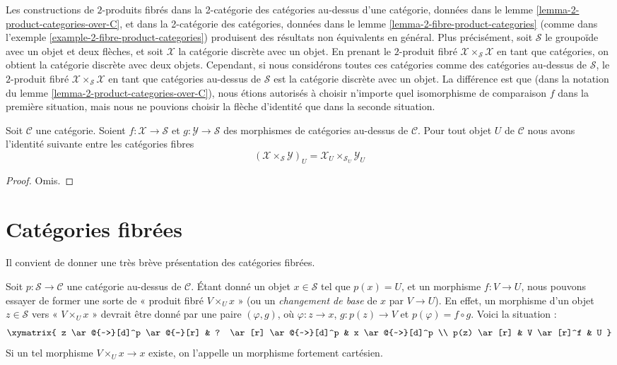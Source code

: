 \begin{example}
\label{example-different-2-fibre-products}
Les constructions de $2$-produits fibrés dans la 2-catégorie des catégories
au-dessus d'une catégorie, données dans le lemme \ref{lemma-2-product-categories-over-C},
et dans la 2-catégorie des catégories, données dans le lemme
\ref{lemma-2-fibre-product-categories} (comme dans l'exemple
\ref{example-2-fibre-product-categories}) produisent des résultats non
équivalents en général. Plus précisément, soit $\mathcal{S}$ le groupoïde
avec un objet et deux flèches, et soit $\mathcal{X}$ la catégorie discrète
avec un objet. En prenant le $2$-produit fibré $\mathcal{X} \times_\mathcal{S} \mathcal{X}$ en tant que catégories, on obtient la catégorie
discrète avec deux objets. Cependant, si nous considérons toutes ces catégories
comme des catégories au-dessus de $\mathcal{S}$, le $2$-produit fibré $\mathcal{X} \times_\mathcal{S} \mathcal{X}$ en tant que catégories au-dessus de $\mathcal{S}$ est
la catégorie discrète avec un objet. La différence est que (dans la notation
du lemme \ref{lemma-2-product-categories-over-C}), nous étions autorisés à
choisir n'importe quel isomorphisme de comparaison $f$ dans la première
situation, mais nous ne pouvions choisir la flèche d'identité que dans la
seconde situation.
\end{example}

\begin{lemma}
\label{lemma-fibre-2-fibre-product-categories-over-C}
Soit $\mathcal{C}$ une catégorie. Soient $f : \mathcal{X} \to \mathcal{S}$ et $g : \mathcal{Y} \to \mathcal{S}$ des morphismes de catégories au-dessus de $\mathcal{C}$.
Pour tout objet $U$ de $\mathcal{C}$ nous avons l'identité suivante entre les
catégories fibres
$$
\left(\mathcal{X} \times_\mathcal{S}\mathcal{Y}\right)_U
=
\mathcal{X}_U \times_{\mathcal{S}_U} \mathcal{Y}_U
$$
\end{lemma}

\begin{proof}
Omis.
\end{proof}

\section{Catégories fibrées}
\label{section-fibred-categories}

\noindent
Il convient de donner une très brève présentation des catégories fibrées.

\medskip\noindent
Soit $p : \mathcal{S} \to \mathcal{C}$ une catégorie au-dessus de
$\mathcal{C}$. Étant donné un objet $x \in \mathcal{S}$ tel que $p(x) = U$,
et un morphisme $f : V \to U$, nous pouvons essayer de former une sorte de
« produit fibré $V \times_U x$ » (ou un {\it changement de base} de $x$
par $V \to U$). En effet, un morphisme d'un objet $z \in \mathcal{S}$
vers « $V \times_U x$ » devrait être donné par une paire
$(\varphi, g)$, où
$\varphi : z \to x$, $g : p(z) \to V$ et
$p(\varphi) = f \circ g$. Voici la situation :
$$
\xymatrix{
z \ar@{~>}[d]^p \ar@{-}[r] &
? \ar[r] \ar@{~>}[d]^p &
x \ar@{~>}[d]^p \\
p(z) \ar[r] & V \ar[r]^f & U
}
$$
Si un tel morphisme $V \times_U x \to x$ existe, on l'appelle un morphisme
fortement cartésien.

